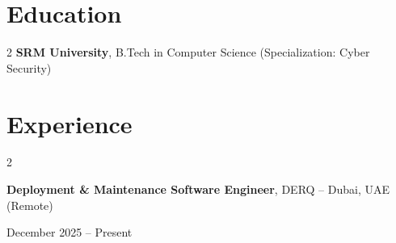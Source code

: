 \documentclass[10pt, letterpaper]{article}
\newenvironment{twocolentry}[2][]{
    \onecolentry
    \def\secondColumn{#2}
    \setcolumnwidth{\fill, 4.5 cm}
    \begin{paracol}{2}
}{
    \switchcolumn \raggedleft \secondColumn
    \end{paracol}
    \endonecolentry
} %
\begin{document}
        \section{Education}
\begin{twocolentry}{}{}
    \textbf{SRM University}, B.Tech in Computer Science (Specialization: Cyber Security)
\end{twocolentry}
        \vspace{0.2 cm}

    \section{Experience}
\begin{twocolentry}{
    December 2025 – Present
}
    \textbf{Deployment \& Maintenance Software Engineer}, DERQ -- Dubai, UAE (Remote)
\end{twocolentry}
\vspace{0.10 cm}
\end{document}
